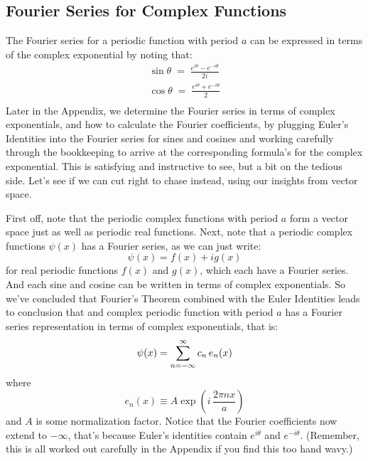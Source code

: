 \documentclass[12pt]{book}
\begin{document}
\subsection{Fourier Series for Complex Functions}

The Fourier series for a periodic function with period $a$ can be expressed in terms of the complex exponential by noting that:
\begin{eqnarray*}
\sin\theta \; = \; \frac{e^{i \theta} - e^{-i \theta}}{2i} \\[5pt]
\cos\theta \; = \; \frac{e^{i \theta} + e^{-i \theta}}{2} \\
\end{eqnarray*}
Later in the Appendix, we determine the Fourier series in terms of complex exponentials, and how to calculate the Fourier coefficients, by plugging Euler's Identities into the Fourier series for sines and cosines and working carefully through the bookkeeping to arrive at the corresponding formula's for the complex exponential.  This is satisfying and instructive to see, but a bit on the tedious side.  Let's see if we can cut right to chase instead, using our insights from vector space.

First off, note that the periodic complex functions with period $a$ form a vector space just as well as periodic real functions.  Next, note that a periodic complex functions $\psi(x)$ has a Fourier series, as we can just write:
$$\psi(x) = f(x) + i g(x)$$ 
for real periodic functions $f(x)$ and $g(x)$, which each have a Fourier series.  And each sine and cosine can be written in terms of complex exponentials.  So we've concluded that Fourier's Theorem combined with the Euler Identities leads to conclusion that and complex periodic function with period $a$ has a Fourier series representation in terms of complex exponentials, that is:
\begin{equation}
\psi(x) = \sum_{n=-\infty}^{\infty}  c_n \, e_n(x)  \\
\end{equation}
where
\begin{equation*}
e_n(x) \equiv A \exp\left( i \, \frac{2 \pi n x}{a}\right)
\end{equation*}
and $A$ is some normalization factor.  Notice that the Fourier coefficients now extend to $-\infty$, that's because Euler's identities contain $e^{i\theta}$ and $e^{-i\theta}$.  (Remember, this is all worked out carefully in the Appendix if you find this too hand wavy.)
\end{document}
